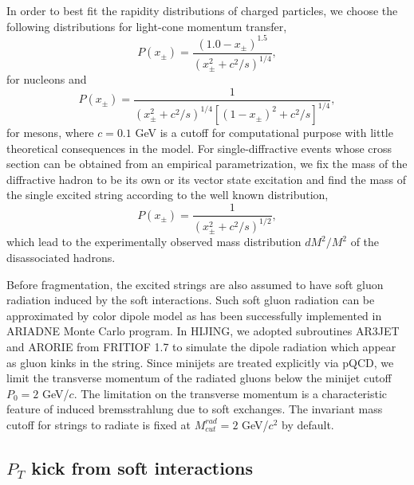         In order to best fit the rapidity distributions of charged
particles, we choose the following distributions for light-cone
momentum transfer,
\begin{equation}
        P(x_{\pm})=\frac{(1.0-x_{\pm})^{1.5}}
                {(x_{\pm}^2+c^2/s)^{1/4}},
                \label{eq:xdistr1}
\end{equation}
for nucleons and
\begin{equation}
        P(x_{\pm})=\frac{1}{(x_{\pm}^2+c^2/s)^{1/4}
                [(1-x_{\pm})^2+c^2/s]^{1/4}},
                \label{eq:xdistr2}
\end{equation}
for mesons, where $c=0.1$ GeV is a cutoff for computational 
purpose with little theoretical consequences in the model.  
For single-diffractive events whose cross section 
can be obtained from an empirical parametrization\cite{goulianos},
we fix the mass of the diffractive hadron to be its own or its 
vector state excitation and find the mass of the single excited
string according to the well known distribution,
\begin{equation}
        P(x_{\pm})=\frac{1}{(x_{\pm}^2+c^2/s)^{1/2}}, \label{eq:xdistr3}
\end{equation}
which lead to the experimentally observed\cite{goulianos} 
mass distribution $dM^2/M^2$ of the disassociated hadrons.

        Before fragmentation, the excited strings are also assumed to
have soft gluon radiation induced by the soft interactions. Such
soft gluon radiation can be approximated by color dipole model
as has been successfully implemented in ARIADNE Monte Carlo
program\cite{dipole}. In HIJING, we adopted subroutines AR3JET
and ARORIE from FRITIOF 1.7\cite{fritiof} to simulate the dipole
radiation which appear as gluon kinks in the string. Since minijets 
are treated explicitly via pQCD, we limit the transverse momentum 
of the radiated gluons below the minijet cutoff $P_{0}=2$ GeV/$c$. 
The limitation on the transverse momentum is a characteristic
feature of induced bremsstrahlung due to soft exchanges\cite{gunion}.
The invariant mass cutoff for strings to radiate is fixed at 
$M_{cut}^{rad}=2$ GeV/$c^2$ by default. 


\subsection{$P_T$ kick from soft interactions}


